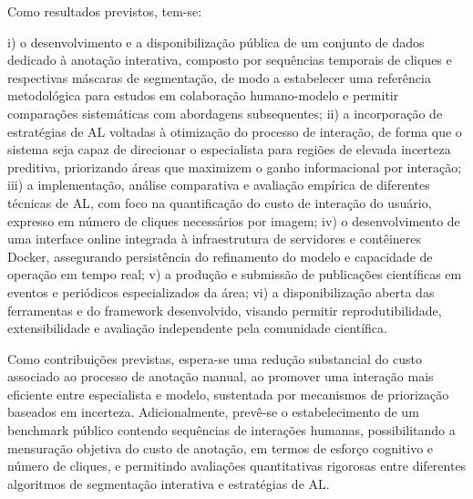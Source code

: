 Como resultados previstos, tem-se:

i) o desenvolvimento e a disponibilização pública de um conjunto de dados dedicado à anotação interativa, composto por sequências temporais de cliques e respectivas máscaras de segmentação, de modo a estabelecer uma referência metodológica para estudos em colaboração humano-modelo e permitir comparações sistemáticas com abordagens subsequentes; ii) a incorporação de estratégias de \ac{AL} voltadas à otimização do processo de interação, de forma que o sistema seja capaz de direcionar o especialista para regiões de elevada incerteza preditiva, priorizando áreas que maximizem o ganho informacional por interação; iii) a implementação, análise comparativa e avaliação empírica de diferentes técnicas de \ac{AL}, com foco na quantificação do custo de interação do usuário, expresso em número de cliques necessários por imagem; iv) o desenvolvimento de uma interface online integrada à infraestrutura de servidores e contêineres Docker, assegurando persistência do refinamento do modelo e capacidade de operação em tempo real; v) a produção e submissão de publicações científicas em eventos e periódicos especializados da área; vi) a disponibilização aberta das ferramentas e do framework desenvolvido, visando permitir reprodutibilidade, extensibilidade e avaliação independente pela comunidade científica.

Como contribuições previstas, espera-se uma redução substancial do custo associado ao processo de anotação manual, ao promover uma interação mais eficiente entre especialista e modelo, sustentada por mecanismos de priorização baseados em incerteza. Adicionalmente, prevê-se o estabelecimento de um benchmark público contendo sequências de interações humanas, possibilitando a mensuração objetiva do custo de anotação, em termos de esforço cognitivo e número de cliques, e permitindo avaliações quantitativas rigorosas entre diferentes algoritmos de segmentação interativa e estratégias de \ac{AL}.


